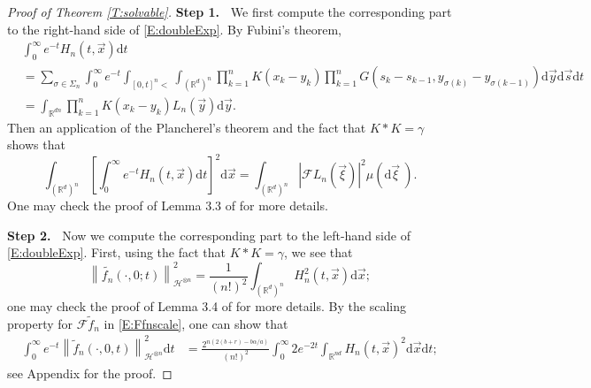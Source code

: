 \documentclass[12pt]{report}
\theoremstyle{plain}
\theoremstyle{definition}
\numberwithin{equation}{section}
\newcommand{\R}{\mathbb{R}}
\newcommand{\Norm}[1]{\left\|  #1   \right\|}
\newcommand{\ud}{\ensuremath{ \mathrm{d} }}
\begin{document}
\begin{proof}[Proof of Theorem \ref{T:solvable}]
	
	{\bigskip\bf\noindent Step 1.~}%
	We first compute the corresponding part to the right-hand side of \eqref{E:doubleExp}. By Fubini's
	theorem,
	\begin{align*}
	& \int_0^\infty e^{-t} H_n(t,\vec{x}) \ud t                                                                                                                                                                   \\
	& = \sum_{\sigma \in \Sigma_n} \int_0^\infty e^{-t} \int_{[0,t]^n <} \int_{(\R^d)^n} \prod_{k=1}^n K(x_k-y_k)   \prod_{k=1}^n G(s_k - s_{k-1}, y_{\sigma(k)} - y_{\sigma(k-1)}) \ud \vec{y} \ud \vec{s} \ud t \\
	& = \int_{\R^{dn}} \prod_{k=1}^n K(x_k-y_k) L_n\left(\vec{y}\right) \ud \vec{y}.
	\end{align*}
	Then an application of the Plancherel's theorem and the fact that $K*K=\gamma$ shows that
	\begin{equation} \label{E:Hneq1}
	\int_{(\R^d)^n} \left[ \int_0^\infty e^{-t} H_n(t,\vec{x}) \ud t \right]^2 \ud \vec{x}
	= \int_{(\R^d)^n} | \mathcal{F}L_n(\vec{\xi}) |^2 \mu(\ud \vec{\xi}\:).
	\end{equation}
	One may check the proof of Lemma 3.3 of \cite{balan.chen.ea:22:exact} for more details.%
	
	{\bigskip\bf\noindent Step 2.~}%
	Now we compute the corresponding part to the left-hand side of
	\eqref{E:doubleExp}.  First, using the fact that $K*K=\gamma$, we see that
	\begin{equation} \label{E:inteq1}
	\Norm{\widetilde{f_n}(\cdot,0;t)}_{\mathcal{H}^{\otimes n}}^2 = \frac{1}{(n!)^2}\int_{(\R^d)^n} H_n^2(t,\vec{x}) \ud \vec{x};
	\end{equation}
	one may check the proof of Lemma 3.4 of \cite{balan.chen.ea:22:exact} for more details.  By the scaling property
	for $\mathcal{F}\widetilde{f}_n$ in \eqref{E:Ffnscale}, one can show that
	\begin{align} \label{E:fHn}
	\int_0^\infty e^{-t} \Norm{ \widetilde{f}_n(\cdot,0,t) }_{\mathcal{H}^{\otimes n}}^2 \ud t
	& = \frac{2^{n(2(b+r) - b\alpha/a)}}{(n!)^2}  \int_0^\infty 2e^{-2t} \int_{\R^{nd}} H_n(t,\vec{x})^2 \ud \vec{x} \ud t;
	\end{align}
	see Appendix for the proof.%
	

\end{proof}
\end{document}
